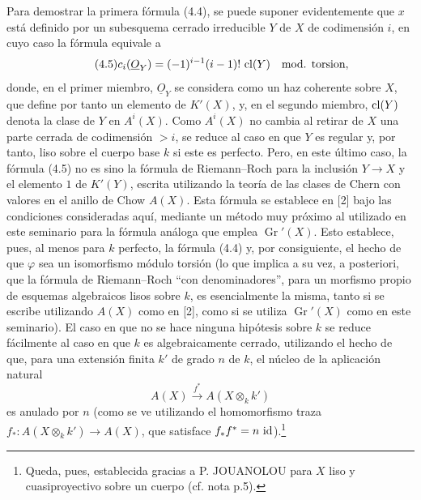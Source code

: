 Para demostrar la primera fórmula (4.4), se puede suponer evidentemente que
$x$ está definido por un subesquema cerrado irreducible $Y$ de $X$ de
codimensión $i$, en cuyo caso la fórmula equivale a
\begin{equation}\tag{4.5}
 c_i(\underline O_Y)=(-1)^{i-1}(i-1)!\,\operatorname{cl}(Y)\quad \text{mod. torsion},
\end{equation}
donde, en el primer miembro, $\underline O_Y$ se considera como un haz
coherente sobre $X$, que define por tanto un elemento de $K'(X)$, y, en el
segundo miembro, $\operatorname{cl}(Y)$ denota la clase de $Y$ en $A^i(X)$. Como $A^i(X)$
no cambia al retirar de $X$ una parte cerrada de codimensión $>i$, se reduce
al caso en que $Y$ es regular y, por tanto, liso sobre el cuerpo base $k$ si
este es perfecto. Pero, en este último caso, la fórmula (4.5) no es sino la
fórmula de Riemann--Roch para la inclusión $Y\to X$ y el elemento $1$ de
$K'(Y)$, escrita utilizando la teoría de las clases de Chern con valores en
el anillo de Chow $A(X)$. Esta fórmula se establece en [2] bajo las
condiciones consideradas aquí, mediante un método muy próximo al utilizado en
este seminario para la fórmula análoga que emplea $\operatorname{Gr}'(X)$.
Esto establece, pues, al menos para $k$ perfecto, la fórmula (4.4) y, por
consiguiente, el hecho de que $\varphi$ sea un isomorfismo módulo torsión (lo
que implica a su vez, a posteriori, que la fórmula de Riemann--Roch ``con
denominadores'', para un morfismo propio de esquemas algebraicos lisos sobre
$k$, es esencialmente la misma, tanto si se escribe utilizando $A(X)$ como en
[2], como si se utiliza $\operatorname{Gr}'(X)$ como en este seminario). El
caso en que no se hace ninguna hipótesis sobre $k$ se reduce fácilmente al caso
en que $k$ es algebraicamente cerrado, utilizando el hecho de que, para una
extensión finita $k'$ de grado $n$ de $k$, el núcleo de la aplicación natural
\[
 A(X)\xrightarrow{f^*}A(X\otimes_k k')
\]
es anulado por $n$ (como se ve utilizando el homomorfismo traza
$f_*:A(X\otimes_k k')\to A(X)$, que satisface
$f_*f^*=n\,\operatorname{id}$).\begingroup\renewcommand{\thefootnote}{*}\footnote{Queda,
pues, establecida gracias a P. JOUANOLOU para $X$ liso y cuasiproyectivo sobre
un cuerpo (cf. nota p.5).}\addtocounter{footnote}{-1}\endgroup

